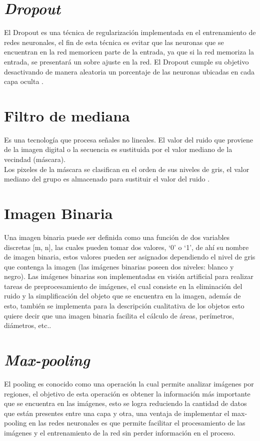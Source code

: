 \section{\textit{Dropout}}

El Dropout es una técnica de regularización implementada en el entrenamiento de redes neuronales, el fin de esta técnica es evitar que las neuronas que se encuentran en la red memoricen parte de la entrada, ya que si la red memoriza la entrada, se presentará un sobre ajuste en la red. El Dropout cumple su objetivo desactivando de manera aleatoria un porcentaje de las neuronas ubicadas en cada capa oculta \cite{drop}.

\section{Filtro de mediana}

Es una tecnología que procesa señales no lineales. El valor del ruido que proviene de la imagen digital o la secuencia es sustituida por el valor mediano de la vecindad (máscara).\\
Los pixeles de la máscara se clasifican en el orden de sus niveles de gris, el valor mediano del grupo es almacenado para sustituir el valor del ruido \cite{zhu2012improved}.

\section{Imagen Binaria} Una imagen binaria puede ser definida como una función de dos variables discretas [m, n], las cuales pueden	 tomar dos valores, ‘0’ o ‘1’, de ahí su nombre de imagen binaria, estos valores pueden ser asignados dependiendo el nivel de gris que contenga la imagen (las imágenes binarias poseen dos niveles: blanco y negro). Las imágenes binarias son implementadas en visión artificial para realizar tareas de preprocesamiento de imágenes, el cual consiste en la eliminación del ruido y la simplificación del objeto que se encuentra en la imagen, además de esto, también se implementa para la descripción cualitativa de los objetos esto quiere decir que una imagen binaria facilita el cálculo de áreas, perímetros, diámetros, etc.\cite{ref_12}.

\section{\textit{Max-pooling}}

El pooling es conocido como una operación la cual permite analizar imágenes por regiones, el objetivo de esta operación es obtener la información más importante que se encuentra en las imágenes, esto se logra reduciendo la cantidad de datos que están presentes entre una capa y otra, una ventaja de implementar el max-pooling en las redes neuronales es que permite facilitar el procesamiento de las imágenes y el entrenamiento de la red sin perder información en el proceso.\\

